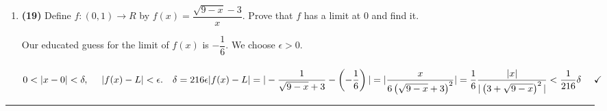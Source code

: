 \documentclass[fleqn]{article}
\begin{document}
\begin{enumerate}
    \item \textbf{(19)} Define $f: (0, 1) \longrightarrow R$ by $f(x)=\dfrac{\sqrt{9-x}-3}{x}$. Prove that $f$ has a limit 
    at $0$ and find it.

      \textcolor{hwColor}{
        Our educated guess for the limit of $f(x)$ is $-\dfrac{1}{6}$. We choose $\epsilon > 0$.
        \\
        \\
        $
          0 < |x-0| < \delta, ~~~~ |f(x)-L| < \epsilon. ~~~ \delta=216 \epsilon
          \\
          \\
          |f(x)-L|
          \\
          \\
          \\
          =|-\dfrac{1}{\sqrt{9-x}+3}-\left(-\dfrac{1}{6}\right)|
          \\
          \\
          \\
          =|\dfrac{x}{6\left(\sqrt{9-x}+3\right)^2}|
          \\
          \\
          \\
          =\dfrac{1}{6} \dfrac{|x|}{|\left(3+\sqrt{9-x}\right)^2|} < \dfrac{1}{216} \delta ~~~~ \checkmark
        $
        \\
      }

  \end{enumerate}

  \rule{15cm}{2pt}
\end{document}
